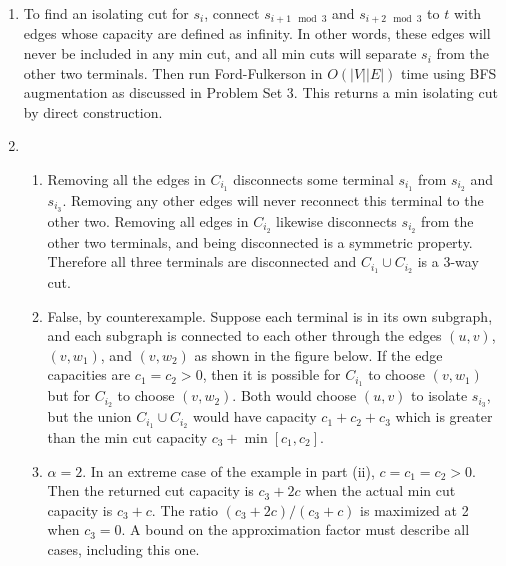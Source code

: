 \documentclass[12pt]{article}
\begin{document}
\begin{enumerate}

\item %

To find an isolating cut for $s_i$, connect $s_{i+1 \mod 3}$ and $s_{i+2 \mod 3}$ to $t$ with edges whose capacity are defined as infinity. In other words,
these edges will never be included in any min cut, and all min cuts will
separate $s_i$ from the other two terminals.
Then run Ford-Fulkerson in $O(|V||E|)$ time using BFS augmentation as
discussed in Problem Set 3.
This returns a min isolating cut by direct construction.

\item %

\begin{enumerate}
\item %
Removing all the edges in $C_{i_1}$ disconnects some terminal
$s_{i_1}$ from $s_{i_2}$ and $s_{i_3}$. Removing any other edges will
never reconnect this terminal to the other two. Removing all edges in
$C_{i_2}$ likewise disconnects $s_{i_2}$ from the other two terminals,
and being disconnected is a symmetric property. Therefore all three terminals
are disconnected and $C_{i_1} \cup C_{i_2}$ is a 3-way cut.

\item %
False, by counterexample. Suppose each terminal is in its own subgraph,
and each subgraph is connected to each other through the edges $(u,v)$,
$(v,w_1)$, and $(v,w_2)$ as shown in the figure below. If the edge
capacities are $c_1 = c_2 > 0$, then it is possible for $C_{i_1}$ to choose
$(v,w_1)$ but for $C_{i_2}$ to choose
$(v,w_2)$. Both would choose $(u,v)$ to isolate
$s_{i_3}$, but the union $C_{i_1} \cup C_{i_2}$ would have capacity
$c_1 + c_2 + c_3$ which is greater than the min cut capacity
$c_3 + \min\left[c_1,c_2\right]$.

\begin{figure}[hbt]
  
  \centerline{\box\graph}
\end{figure}

\item %
$\alpha = 2$. In an extreme case of the example in part (ii),
$c = c_1 = c_2 > 0$. Then the returned cut capacity is $c_3 + 2c$
when the actual min cut capacity is $c_3 + c$. The ratio
$(c_3 + 2c) / (c_3 + c)$ is maximized at 2 when $c_3 = 0$. A bound on
the approximation factor must describe all cases, including this one.

\end{enumerate}

\end{enumerate}
\end{document}

